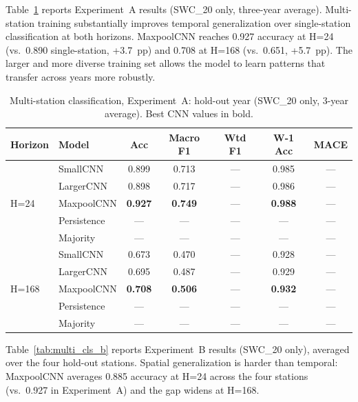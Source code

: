 \documentclass[11pt]{article}
\begin{document}
Table~\ref{tab:multi_cls_a} reports Experiment~A results (SWC\_20 only, three-year
average). Multi-station training substantially improves temporal generalization
over single-station classification at both horizons. MaxpoolCNN reaches
0.927 accuracy at H=24 (vs.\ 0.890 single-station, +3.7~pp) and 0.708 at
H=168 (vs.\ 0.651, +5.7~pp). The larger and more diverse training set allows
the model to learn patterns that transfer across years more robustly.

\begin{table}[h]
\centering
\caption{Multi-station classification, Experiment~A: hold-out year
(SWC\_20 only, 3-year average). Best CNN values in bold.}
\label{tab:multi_cls_a}
\small
\begin{tabular}{llccccc}
\toprule
Horizon & Model & Acc & Macro F1 & Wtd F1 & W-1 Acc & MACE \\
\midrule
\multirow{5}{*}{H=24}
 & SmallCNN     & 0.899 & 0.713 & --- & 0.985 & --- \\
 & LargerCNN    & 0.898 & 0.717 & --- & 0.986 & --- \\
 & MaxpoolCNN   & \textbf{0.927} & \textbf{0.749} & --- & \textbf{0.988} & --- \\
 & Persistence  & --- & --- & --- & --- & --- \\
 & Majority     & --- & --- & --- & --- & --- \\
\midrule
\multirow{5}{*}{H=168}
 & SmallCNN     & 0.673 & 0.470 & --- & 0.928 & --- \\
 & LargerCNN    & 0.695 & 0.487 & --- & 0.929 & --- \\
 & MaxpoolCNN   & \textbf{0.708} & \textbf{0.506} & --- & \textbf{0.932} & --- \\
 & Persistence  & --- & --- & --- & --- & --- \\
 & Majority     & --- & --- & --- & --- & --- \\
\bottomrule
\end{tabular}
\end{table}

Table~\ref{tab:multi_cls_b} reports Experiment~B results (SWC\_20 only),
averaged over the four hold-out stations. Spatial generalization is harder than
temporal: MaxpoolCNN averages 0.885 accuracy at H=24 across the four stations
(vs.\ 0.927 in Experiment~A) and the gap widens at H=168.
\end{document}
